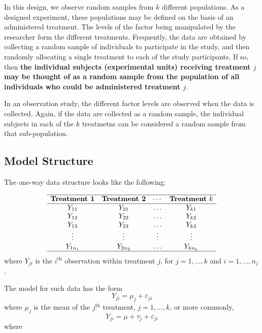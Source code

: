 \documentclass[
]{book}
\begin{document}
In this design, we observe random samples from \(k\) different populations.
As a designed experiment, these populations may be defined on the basis of an administered treatment.
The levels of the factor being manipulated by the researcher form the different treatments.
Frequently, the data are obtained by collecting a random sample of individuals to participate in the study, and then randomly allocating a single treatment to each of the study participants.
If so, then \textbf{the individual subjects (experimental units) receiving treatment \(j\) may be thought of as a random sample from the population of all individuals who could be administered treatment \(j\)}.

In an observation study, the different factor levels are observed when the data is collected.
Again, if the data are collected as a random sample, the individual subjects in each of the \(k\) treatmetns can be considered a random sample from that sub-population.

\hypertarget{model-structure}{%
\subsection{Model Structure}\label{model-structure}}

The one-way data structure looks like the following:

\[\begin{array}{cccc}
\hline
\textbf{Treatment 1} & \textbf{Treatment 2} & \cdots & \textbf{Treatment}~k  \\
\hline
Y_{11} & Y_{21} & \ldots & Y_{k1} \\
Y_{12} & Y_{22} & \ldots & Y_{k2} \\
Y_{13} & Y_{23} & \ldots & Y_{k3} \\
\vdots & \vdots & \vdots & \vdots \\
Y_{1n_{1}} & Y_{2n_{2}} & \ldots & Y_{kn_{k}} \\
\hline
\end{array}\]
where \(Y_{ji}\) is the \(i^\mathrm{th}\) observation within treatment \(j\), for \(j=1,\ldots,k\) and \(i=1,\ldots, n_j\).

The model for such data has the form
\begin{equation}
Y_{ji} = \mu_j + \varepsilon_{ji} 
\label{eq:onewayAnovaModel}
\end{equation}
where \(\mu_j\) is the mean of the \(j^\mathrm{th}\) treatment, \(j=1,\ldots,k\), or more commonly,
\[
Y_{ji} = \mu + \tau_j + \varepsilon_{ji}
\]
where
\end{document}
